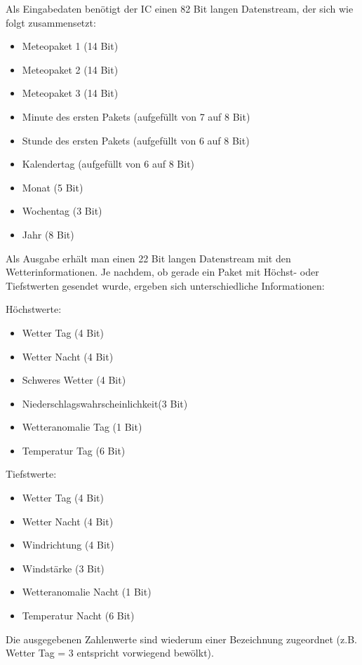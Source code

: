 \documentclass[a4paper,11pt]{article}
\begin{document}
\vspace{0.2cm}
\noindent
Als Eingabedaten benötigt der IC einen 82 Bit langen Datenstream, der sich wie folgt zusammensetzt:
\begin{itemize}
  \item Meteopaket 1 (14 Bit)
  \item Meteopaket 2 (14 Bit)
  \item Meteopaket 3 (14 Bit)
  \item Minute des ersten Pakets (aufgefüllt von 7 auf 8 Bit)
  \item Stunde des ersten Pakets (aufgefüllt von 6 auf 8 Bit)
  \item Kalendertag (aufgefüllt von 6 auf 8 Bit)
  \item Monat (5 Bit)
  \item Wochentag (3 Bit)
  \item Jahr (8 Bit)
\end{itemize}

\noindent
Als Ausgabe erhält man einen 22 Bit langen Datenstream mit den Wetterinformationen. Je nachdem, ob gerade ein Paket mit Höchst- oder Tiefstwerten gesendet wurde, 
ergeben sich unterschiedliche Informationen:

\vspace{0.2cm}
\noindent
Höchstwerte:
\begin{itemize}
  \item Wetter Tag (4 Bit)
  \item Wetter Nacht (4 Bit)
  \item Schweres Wetter (4 Bit)
  \item Niederschlagswahrscheinlichkeit(3 Bit)
  \item Wetteranomalie Tag (1 Bit)
  \item Temperatur Tag (6 Bit)
\end{itemize}

\vspace{0.2cm}
\noindent
Tiefstwerte:
\begin{itemize}
  \item Wetter Tag (4 Bit)
  \item Wetter Nacht (4 Bit)
  \item Windrichtung (4 Bit)
  \item Windstärke (3 Bit)
  \item Wetteranomalie Nacht (1 Bit)
  \item Temperatur Nacht (6 Bit)
\end{itemize}

\noindent
Die ausgegebenen Zahlenwerte sind wiederum einer Bezeichnung zugeordnet (z.B. Wetter Tag = 3 entspricht vorwiegend bewölkt).
\end{document}
